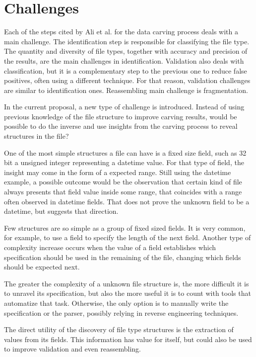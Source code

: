 \section{Challenges}

Each of the steps cited by Ali et al. \cite{ali_review_2018} for the data carving process deals with a main challenge. The identification step is responsible for classifying the file type. The quantity and diversity of file types, together with accuracy and precision of the results, are the main challenges in identification. Validation also deals with classification, but it is a complementary step to the previous one to reduce false positives, often using a different technique. For that reason, validation challenges are similar to identification ones. Reassembling main challenge is fragmentation.

In the current proposal, a new type of challenge is introduced. Instead of using previous knowledge of the file structure to improve carving results, would be possible to do the inverse and use insights from the carving process to reveal structures in the file?

One of the most simple structures a file can have is a fixed size field, such as 32 bit a unsigned integer representing a datetime value. For that type of field, the insight may come in the form of a expected range. Still using the datetime example, a possible outcome would be the observation that certain kind of file always presents that field value inside some range, that coincides with a range often observed in datetime fields. That does not prove the unknown field to be a datetime, but suggests that direction.

Few structures are so simple as a group of fixed sized fields. It is very common, for example, to use a field to specify the length of the next field. Another type of complexity increase occurs when the value of a field establishes which specification should be used in the remaining of the file, changing which fields should be expected next.

The greater the complexity of a unknown file structure is, the more difficult it is to unravel its specification, but also the more useful it is to count with tools that automatize that task. Otherwise, the only option is to manually write the specification or the parser, possibly relying in reverse engineering techniques.

The direct utility of the discovery of file type structures is the extraction of values from its fields. This information has value for itself, but could also be used to improve validation and even reassembling. 
